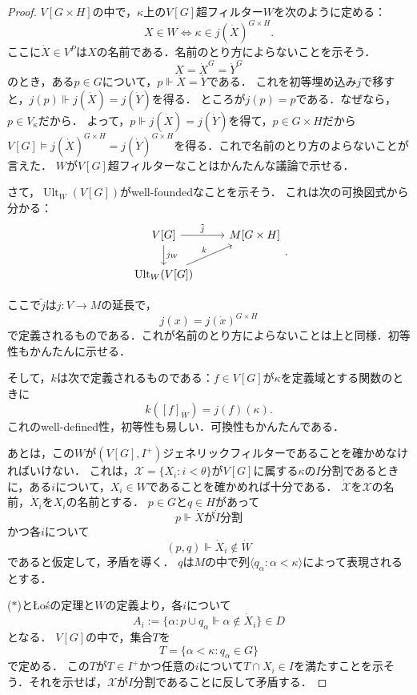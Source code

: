\documentclass[uplatex]{jsarticle}
\newcommand\forces{\Vdash}
\newcommand{\Ult}{\operatorname{Ult}}
\newcommand{\seq}[1]{{\langle#1\rangle}}
\theoremstyle{definition}
\begin{document}
\begin{proof}
		$V[G \times H]$の中で，$\kappa$上の$V[G]$超フィルター$W$を次のように定める：
		\[
		 X \in W \iff \kappa \in j(\dot{X})^{G\times H}.
		\]
		ここに$\dot{X} \in V^{P}$は$X$の名前である．名前のとり方によらないことを示そう．
		\[
		X = \dot{X}^{G} = \dot{Y}^{G}
		\]
		のとき，ある$p \in G$について，$p \forces \dot{X} = \dot{Y}$である．
		これを初等埋め込み$j$で移すと，$j(p) \forces j(\dot{X}) = j(\dot{Y})$を得る．
		ところが$j(p) = p$である．なぜなら，$p \in V_\kappa$だから．
		よって，$p \forces j(\dot{X}) = j(\dot{Y})$を得て，$p \in G \times H$だから$V[G] \models j(\dot{X})^{G \times H} = j(\dot{Y})^{G \times H}$を得る．これで名前のとり方のよらないことが言えた．
		$W$が$V[G]$超フィルターなことはかんたんな議論で示せる．
		
		さて，$\Ult_W(V[G])$がwell-foundedなことを示そう．
		これは次の可換図式から分かる：
		\[
		\begin{tikzcd}
			V[G] \arrow[r,"\tilde{j}"] \arrow[d,"j_W"] & M[G \times H]\\
			\Ult_W(V[G]) \arrow[ur,"k"]
		\end{tikzcd}.
		\]
		
		ここで$\tilde{j}$は$j \colon V \to M$の延長で，
		\[
		j(x) = j(\dot{x})^{G \times H}
		\]
		で定義されるものである．これが名前のとり方によらないことは上と同様．初等性もかんたんに示せる．
		
		そして，$k$は次で定義されるものである：$f \in V[G]$が$\kappa$を定義域とする関数のときに
		\[
		k([f]_W) = j(f)(\kappa).
		\]
		これのwell-defined性，初等性も易しい．可換性もかんたんである．
		
		あとは，この$W$が$(V[G], I^+)$ジェネリックフィルターであることを確かめなければいけない．
		これは，$\mathcal{X} = \{ X_i : i < \theta \}$が$V[G]$に属する$\kappa$の$I$分割であるときに，ある$i$について，$X_i \in W$であることを確かめれば十分である．
		$\dot{\mathcal{X}}$を$\mathcal{X}$の名前，$\dot{X}_i$を$X_i$の名前とする．
		$p \in G$と$q \in H$があって
		\[
		p \forces \text{$\dot{X}$が$\dot{I}$分割}
		\]
		かつ各$i$について
		\[
		(p, q) \forces \dot{X}_i \not \in \dot{W} \tag{$*$}
		\]
		であると仮定して，矛盾を導く．
		$q$は$M$の中で列$\seq{q_\alpha : \alpha < \kappa}$によって表現されるとする．
		
		($*$)とŁośの定理と$W$の定義より，各$i$について
		\[
		A_i := \{ \alpha : p \cup q_\alpha \forces \alpha \not \in \dot{X}_i\} \in D \tag{$**$}
		\]
		となる．
		$V[G]$の中で，集合$T$を
		\[
		T = \{ \alpha < \kappa : q_\alpha \in G \}
		\]
		で定める．
		この$T$が$T \in I^+$かつ任意の$i$について$T \cap X_i \in I$を満たすことを示そう．それを示せば，$\mathcal{X}$が$I$分割であることに反して矛盾する．
		

\end{proof}
\end{document}

